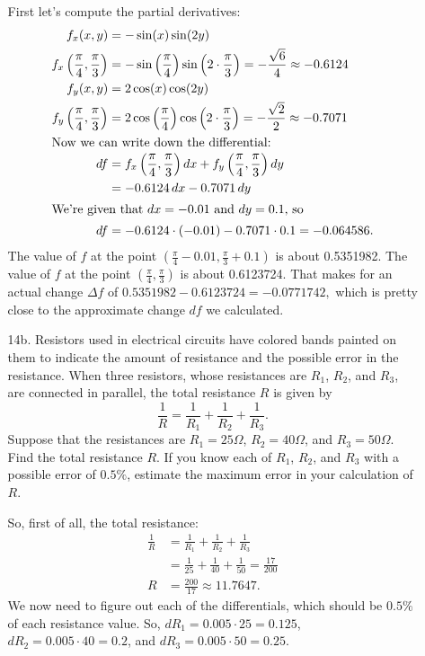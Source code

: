 \documentclass[10pt]{article}
\newenvironment{red}{\color{red}}{\ignorespacesafterend}
\begin{document}
\begin{enumerate}[leftmargin=0pt]
\begin{itemize}
        \begin{red}
        First let's compute the partial derivatives:
        \begin{align*}
            f_x(x,y) &= -\sin(x)\sin(2y) \\
            f_x\left(\frac{\pi}{4}, \frac{\pi}{3}\right)
            &= -\sin\left(\frac{\pi}{4}\right) \sin\left(2\cdot\frac{\pi}{3}\right) = -\frac{\sqrt{6}}{4} \approx -0.6124 \\
            f_y(x,y) &= 2\cos(x)\cos(2y) \\
            f_y\left(\frac{\pi}{4}, \frac{\pi}{3}\right)
            &=2\cos\left(\frac{\pi}{4}\right)\cos\left(2\cdot\frac{\pi}{3}\right) = -\frac{\sqrt{2}}{2} \approx -0.7071 \\
            \intertext{Now we can write down the differential:}
            df &= f_x\left(\frac{\pi}{4}, \frac{\pi}{3}\right) dx + f_y\left(\frac{\pi}{4}, \frac{\pi}{3}\right) dy \\
            &= -0.6124\, dx - 0.7071\, dy \\
            \intertext{We're given that $dx=-0.01$ and $dy=0.1$, so}
            df &= -0.6124\cdot(-0.01) - 0.7071\cdot 0.1 = -0.064586.
        \end{align*}
        The value of $f$ at the point $\left(\tfrac{\pi}{4}-0.01, \tfrac{\pi}{3}+0.1\right)$ is about 0.5351982. The value of $f$ at the point $\left(\tfrac{\pi}{4}, \tfrac{\pi}{3}\right)$ is about 0.6123724. That makes for an actual change $\Delta f$ of $ 0.5351982 - 0.6123724 = -0.0771742,$ which is pretty close to the approximate change $df$ we calculated.
        \end{red}
        \pagebreak
        
        \item[14b.] Resistors used in electrical circuits have colored bands painted on them to indicate the amount of resistance and the possible error in the resistance. When three resistors, whose resistances are $R_1$, $R_2$, and $R_3$, are connected in parallel, the total resistance $R$ is given by \[\frac1R = \frac1{R_1} + \frac1{R_2} + \frac1{R_3}.\]
        Suppose that the resistances are $R_1 = 25\Omega$, $R_2 = 40\Omega$, and $R_3 = 50\Omega$. Find the total resistance $R$. If you know each of $R_1$, $R_2$, and $R_3$ with a possible error of $0.5\%$, estimate the maximum error in your calculation of $R$.
        
        \begin{red}
        So, first of all, the total resistance:
        \begin{align*}
            \frac1R &= \frac1{R_1} + \frac1{R_2} + \frac1{R_3} \\
            &= \frac{1}{25} + \frac{1}{40} + \frac{1}{50} = \frac{17}{200} \\
            R &= \frac{200}{17} \approx 11.7647.
        \end{align*}
        We now need to figure out each of the differentials, which should be $0.5\%$ of each resistance value. So, $dR_1 = 0.005\cdot 25 = 0.125$, $dR_2 = 0.005\cdot 40 = 0.2$, and $dR_3 = 0.005\cdot 50 = 0.25$.
        

\end{red}
\end{itemize}
\end{enumerate}
\end{document}
